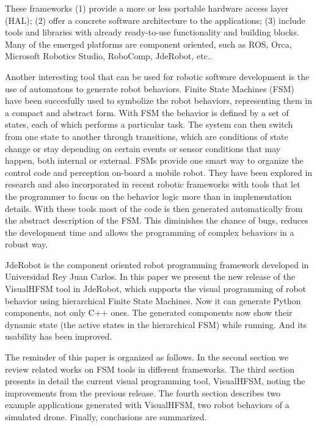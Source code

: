 \documentclass[journal,twoside]{JoPhA}
\begin{document}
These frameworks (1) provide a more or less portable hardware access layer (HAL); (2) offer a concrete software architecture to the applications; (3) include tools and libraries with already ready-to-use functionality and building blocks. Many of the emerged platforms are component oriented, such as ROS, Orca, Microsoft Robotics Studio, RoboComp, JdeRobot, etc..

Another interesting tool that can be used for robotic software development is the use of automatons to generate robot behaviors. Finite State Machines (FSM) have been succesfully used to symbolize the robot behaviors, representing them in a compact and abstract form. With FSM the behavior is defined by a set of states, each of which performs a particular task. The system can then switch from one state to another through transitions, which are conditions of state change or stay depending on certain events or sensor conditions that may happen, both internal or external. FSMs provide one smart way to organize the control code and perception on-board a mobile robot. They have been explored in research and also incorporated in recent robotic frameworks with tools that let the programmer to focus on the behavior logic more than in implementation details. With these tools most of the code is then generated automatically from the abstract description of the FSM. This diminishes the chance of bugs, reduces the development time and allows the programming of complex behaviors in a robust way.

JdeRobot is the component oriented robot programming framework developed in Universidad Rey Juan Carlos. In this paper we present the new release of the VisualHFSM tool in JdeRobot, which supports the visual programming of robot behavior using hierarchical Finite State Machines. Now it can generate Python components, not only C++ ones. The generated components now show their dynamic state (the active states in the hierarchical FSM) while running. And its usability has been improved.

The reminder of this paper is organized as follows. In the second section we review related works on FSM tools in different frameworks. The third section presents in detail the current visual programming tool, VisualHFSM, noting the improvements from the previous release. The fourth section describes two example applications generated with VisualHFSM, two robot behaviors of a simulated drone. Finally, conclusions are summarized.
\end{document}
